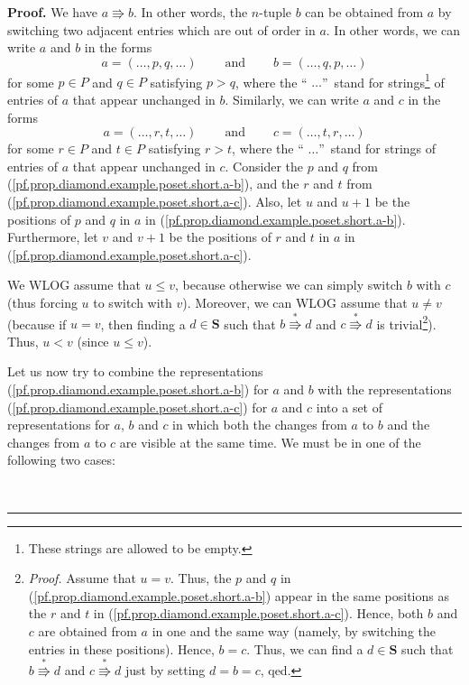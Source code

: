\documentclass[numbers=enddot,12pt,final,onecolumn,notitlepage]{scrartcl}%
\theoremstyle{definition}
\newenvironment{proof}[1][Proof]{\noindent\textbf{#1.} }{\ \rule{0.5em}{0.5em}}
\newenvironment{vershort}{}{}
\begin{document}
\begin{proof}
\begin{vershort}
We have $a\Rrightarrow b$. In other words, the $n$-tuple $b$ can be obtained
from $a$ by switching two adjacent entries which are out of order in $a$. In
other words, we can write $a$ and $b$ in the forms%
\begin{equation}
a=\left(  \ldots,p,q,\ldots\right)  \ \ \ \ \ \ \ \ \ \ \text{and}%
\ \ \ \ \ \ \ \ \ \ b=\left(  \ldots,q,p,\ldots\right)
\label{pf.prop.diamond.example.poset.short.a-b}%
\end{equation}
for some $p\in P$ and $q\in P$ satisfying $p>q$, where the \textquotedblleft%
$\ldots$\textquotedblright\ stand for strings\footnote{These strings are
allowed to be empty.} of entries of $a$ that appear unchanged in $b$.
Similarly, we can write $a$ and $c$ in the forms%
\begin{equation}
a=\left(  \ldots,r,t,\ldots\right)  \ \ \ \ \ \ \ \ \ \ \text{and}%
\ \ \ \ \ \ \ \ \ \ c=\left(  \ldots,t,r,\ldots\right)
\label{pf.prop.diamond.example.poset.short.a-c}%
\end{equation}
for some $r\in P$ and $t\in P$ satisfying $r>t$, where the \textquotedblleft%
$\ldots$\textquotedblright\ stand for strings of entries of $a$ that appear
unchanged in $c$. Consider the $p$ and $q$ from
(\ref{pf.prop.diamond.example.poset.short.a-b}), and the $r$ and $t$ from
(\ref{pf.prop.diamond.example.poset.short.a-c}). Also, let $u$ and $u+1$ be
the positions of $p$ and $q$ in $a$ in
(\ref{pf.prop.diamond.example.poset.short.a-b}). Furthermore, let $v$ and
$v+1$ be the positions of $r$ and $t$ in $a$ in
(\ref{pf.prop.diamond.example.poset.short.a-c}).

We WLOG assume that $u\leq v$, because otherwise we can simply switch $b$ with
$c$ (thus forcing $u$ to switch with $v$). Moreover, we can WLOG assume that
$u\neq v$ (because if $u=v$, then finding a $d\in\mathbf{S}$ such that
$b\overset{\ast}{\Rrightarrow}d$ and $c\overset{\ast}{\Rrightarrow}d$ is
trivial\footnote{\textit{Proof.} Assume that $u=v$. Thus, the $p$ and $q$ in
(\ref{pf.prop.diamond.example.poset.short.a-b}) appear in the same positions
as the $r$ and $t$ in (\ref{pf.prop.diamond.example.poset.short.a-c}). Hence,
both $b$ and $c$ are obtained from $a$ in one and the same way (namely, by
switching the entries in these positions). Hence, $b=c$. Thus, we can find a
$d\in\mathbf{S}$ such that $b\overset{\ast}{\Rrightarrow}d$ and
$c\overset{\ast}{\Rrightarrow}d$ just by setting $d=b=c$, qed.}). Thus, $u<v$
(since $u\leq v$).

Let us now try to combine the representations
(\ref{pf.prop.diamond.example.poset.short.a-b}) for $a$ and $b$ with the
representations (\ref{pf.prop.diamond.example.poset.short.a-c}) for $a$ and
$c$ into a set of representations for $a$, $b$ and $c$ in which both the
changes from $a$ to $b$ and the changes from $a$ to $c$ are visible at the
same time. We must be in one of the following two cases:


\end{vershort}
\end{proof}
\end{document}
